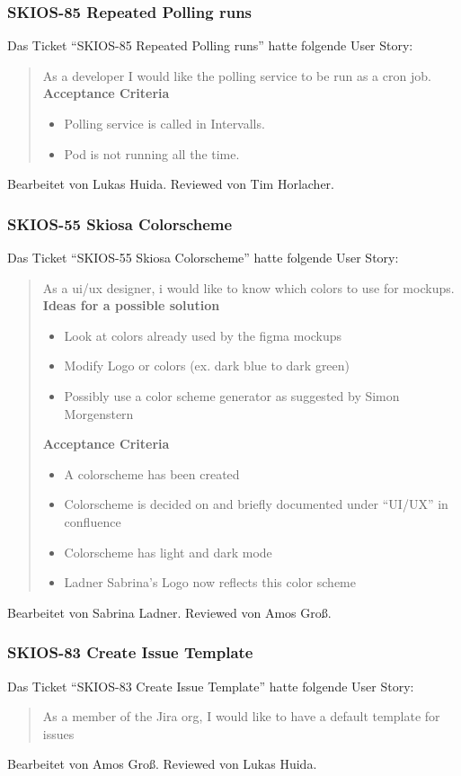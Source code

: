 \subsubsection{SKIOS-85 Repeated Polling runs}
Das Ticket \enquote{SKIOS-85 Repeated Polling runs} hatte folgende User Story:
\begin{quotation}
    As a developer I would like the polling service to be run as a cron job. \\
    \textbf{Acceptance Criteria}
    \begin{itemize}
        \item Polling service is called in Intervalls.
        \item Pod is not running all the time.
    \end{itemize}
\end{quotation}
Bearbeitet von Lukas Huida.
Reviewed von Tim Horlacher.

\subsubsection{SKIOS-55 Skiosa Colorscheme}
Das Ticket \enquote{SKIOS-55 Skiosa Colorscheme} hatte folgende User Story:
\begin{quotation}
    As a ui/ux designer, i would like to know which colors to use for mockups. \\
    \textbf{Ideas for a possible solution}
    \begin{itemize}
    \item Look at colors already used by the figma mockups 
    \item Modify Logo or colors (ex. dark blue to dark green)
    \item Possibly use a color scheme generator as suggested by Simon Morgenstern
    \end{itemize}
    \textbf{Acceptance Criteria}
    \begin{itemize}
    \item A colorscheme has been created
    \item Colorscheme is decided on and briefly documented under “UI/UX” in confluence
    \item Colorscheme has light and dark mode
    \item Ladner Sabrina's Logo now reflects this color scheme
    \end{itemize}
\end{quotation}
Bearbeitet von Sabrina Ladner.
Reviewed von Amos Groß.

\subsubsection{SKIOS-83 Create Issue Template}
Das Ticket \enquote{SKIOS-83 Create Issue Template} hatte folgende User Story:
\begin{quotation}
    As a member of the Jira org, I would like to have a default template for issues
\end{quotation}
Bearbeitet von Amos Groß.
Reviewed von Lukas Huida.


